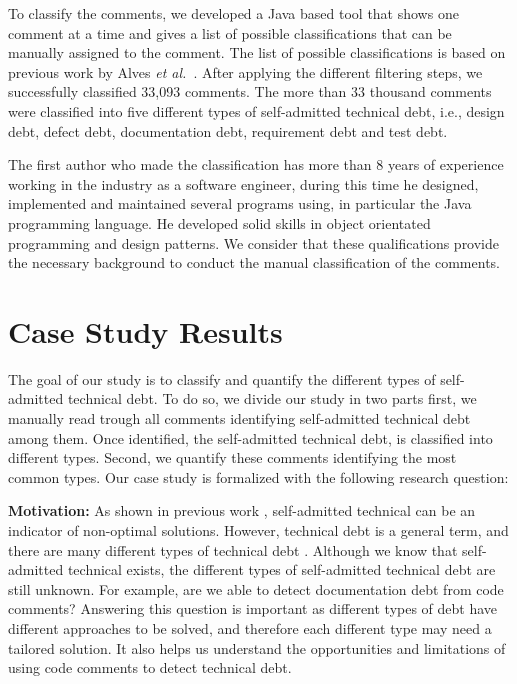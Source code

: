 To classify the comments, we developed a Java based tool that shows one comment at a time and gives a list of possible classifications that can be manually assigned to the comment. The list of possible classifications is based on previous work by Alves \textit{et al.}~\cite{Alves2014MTD}. After applying the different filtering steps, we successfully classified 33,093 comments. The more than 33 thousand comments were classified into five different types of self-admitted technical debt, i.e., design debt, defect debt, documentation debt, requirement debt and test debt.

The first author who made the classification has more than 8 years of experience working in the industry as a software engineer, during this time he designed, implemented and maintained several programs using, in particular the Java programming language. He developed solid skills in object orientated programming and design patterns. We consider that these qualifications provide the necessary background to conduct the manual classification of the comments.   

\section{Case Study Results}
\label{chap3:sec:results}

The goal of our study is to classify and quantify the different types of self-admitted technical debt. To do so, we divide our study in two parts first, we manually read trough all comments identifying self-admitted technical debt among them. Once identified, the self-admitted technical debt, is classified into different types. Second, we quantify these comments identifying the most common types. Our case study is formalized with the following research question:

\vspace{3mm}
\noindent\chapterIIIrqi
\vspace{3mm}

\noindent\textbf{Motivation:} As shown in previous work \cite{Potdar2014ICSME}, self-admitted technical can be an indicator of non-optimal solutions. However, technical debt is a general term, and there are many different types of technical debt \cite{Alves2014MTD}. Although we know that self-admitted technical exists, the different types of self-admitted technical debt are still unknown. For example, are we able to detect documentation debt from code comments? Answering this question is important as different types of debt have different approaches to be solved, and therefore each different type may need a tailored solution. It also helps us understand the opportunities and limitations of using code comments to detect technical debt. 

